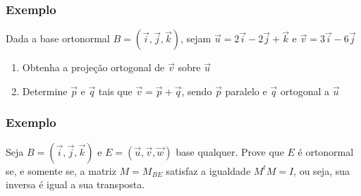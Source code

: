 \documentclass[hyperref={pdfpagelabels=false}]{beamer}
\begin{document}
\begin{frame}
	\frametitle{Exemplo}
	Dada a base ortonormal $B = (\overrightarrow{i},\overrightarrow{j},\overrightarrow{k})$, sejam $\overrightarrow{u} = 2\overrightarrow{i}-2\overrightarrow{j}+\overrightarrow{k}$ e $\overrightarrow{v} = 3\overrightarrow{i} - 6\overrightarrow{j}$
	
	\begin{enumerate}
		\item Obtenha a projeção ortogonal de $\overrightarrow{v}$ sobre $\overrightarrow{u}$
		\item Determine $\overrightarrow{p}$ e $\overrightarrow{q}$ tais que $\overrightarrow{v} = \overrightarrow{p} + \overrightarrow{q}$, sendo $\overrightarrow{p}$ paralelo e $\overrightarrow{q}$ ortogonal a $\overrightarrow{u}$
	\end{enumerate}
\end{frame}

\begin{frame}
	\frametitle{Exemplo}
	
	Seja $B = (\overrightarrow{i},\overrightarrow{j},\overrightarrow{k})$ e $E = (\overrightarrow{u}, \overrightarrow{v}, \overrightarrow{w})$ base qualquer. Prove que $E$ é ortonormal se, e somente se, a matriz $M = M_{BE}$ satisfaz a igualdade $M^tM=I$, ou seja, sua inversa é igual a sua transposta.

	\end{frame}
\end{document}
